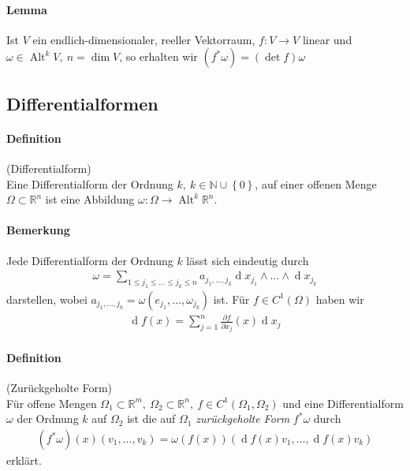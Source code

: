 \documentclass[12pt,a4paper,fleqn]{article}
\def\set#1{{\left\{ #1 \right\}}}
\def\R{{\mathbb{R}}}
\def\d{{\operatorname{d}}}
\begin{document}
\paragraph{Lemma} Ist $V$ ein endlich-dimensionaler, reeller Vektorraum, $f\colon V \rightarrow V$ linear und $\omega \in \operatorname{Alt}^k V,\ n = \dim V$, so erhalten wir $(f^\ast\omega) = (\det f)\omega$

\subsection{Differentialformen}

\paragraph{Definition} (Differentialform)\\
Eine Differentialform der Ordnung $k,\ k \in\mathbb{N} \cup \set{0}$, auf einer offenen Menge $\Omega \subset \R^n$ ist eine Abbildung $\omega\colon \Omega \rightarrow \operatorname{Alt}^k \R^n$.

\paragraph{Bemerkung} Jede Differentialform der Ordnung $k$ lässt sich eindeutig durch 
\begin{align*}
\omega = \sum_{1 \leq j_1 \leq \dotsc \leq j_k \leq n} a_{j_1, \dotsc, j_k} \d x_{j_1}\wedge\dotsc\wedge\d x_{j_k}
\end{align*}
darstellen, wobei $a_{j_1, \dotsc, j_k} = \omega(e_{j_1}, \dotsc, \omega_{j_k})$ ist. Für $f \in C^1(\Omega)$ haben wir 
\begin{align*}
\d f(x) = \sum_{j=1}^n \frac{\partial f}{\partial x_j}(x) \d x_j
\end{align*}

\paragraph{Definition} (Zurückgeholte Form)\\
Für offene Mengen $\Omega_1 \subset \R^m,\ \Omega_2 \subset \R^n,\ f \in C^1(\Omega_1, \Omega_2)$ und eine Differentialform $\omega$ der Ordnung $k$ auf $\Omega_2$ ist die auf $\Omega_1$ \textit{zurückgeholte Form} $f^\ast\omega$ durch 
\begin{align*}
(f^\ast\omega)(x)(v_1, \dotsc, v_k)=\omega(f(x))(\d f(x)v_1, \dotsc, \d f(x)v_k)
\end{align*}
erklärt.
\end{document}
